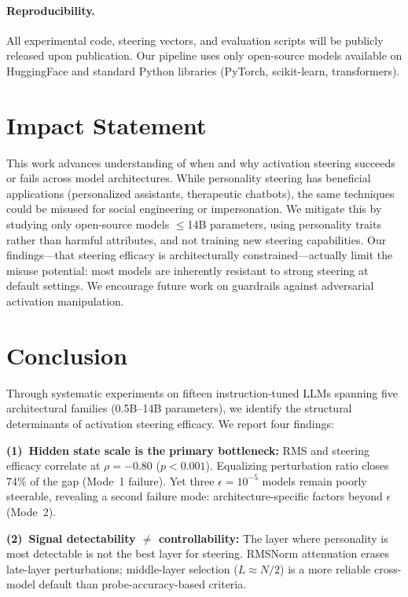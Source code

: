 \documentclass{article}
\begin{document}
\paragraph{Reproducibility.}
All experimental code, steering vectors, and evaluation scripts will be publicly released upon publication. Our pipeline uses only open-source models available on HuggingFace and standard Python libraries (PyTorch, scikit-learn, transformers).

\section*{Impact Statement}
This work advances understanding of when and why activation steering succeeds or fails across model architectures. While personality steering has beneficial applications (personalized assistants, therapeutic chatbots), the same techniques could be misused for social engineering or impersonation. We mitigate this by studying only open-source models $\le$14B parameters, using personality traits rather than harmful attributes, and not training new steering capabilities. Our findings---that steering efficacy is architecturally constrained---actually limit the misuse potential: most models are inherently resistant to strong steering at default settings. We encourage future work on guardrails against adversarial activation manipulation.

\section{Conclusion}\label{sec:conclusion}

Through systematic experiments on fifteen instruction-tuned LLMs spanning five architectural families (0.5B--14B parameters), we identify the structural determinants of activation steering efficacy. We report four findings:

\textbf{(1)~Hidden state scale is the primary bottleneck:} RMS and steering efficacy correlate at $\rho{=}{-}0.80$ ($p{<}0.001$). Equalizing perturbation ratio closes 74\% of the gap (Mode~1 failure). Yet three $\epsilon{=}10^{-5}$ models remain poorly steerable, revealing a second failure mode: architecture-specific factors beyond $\epsilon$ (Mode~2).

\textbf{(2)~Signal detectability $\neq$ controllability:} The layer where personality is most detectable is not the best layer for steering. RMSNorm attenuation erases late-layer perturbations; middle-layer selection ($L \approx N/2$) is a more reliable cross-model default than probe-accuracy-based criteria.
\end{document}
